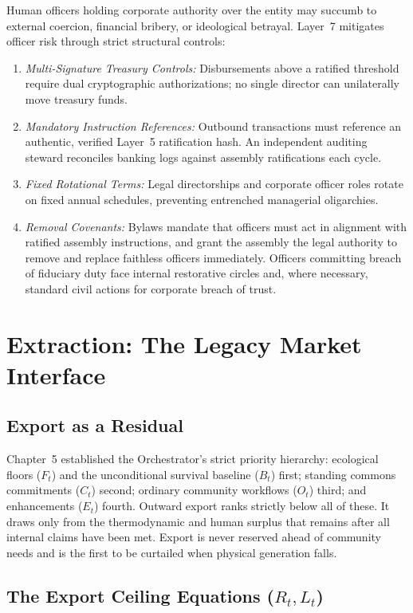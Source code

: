 Human officers holding corporate authority over the entity may succumb to external coercion, financial bribery, or ideological betrayal. Layer~7 mitigates officer risk through strict structural controls:
\begin{enumerate}
  \item \textit{Multi-Signature Treasury Controls:} Disbursements above a ratified threshold require dual cryptographic authorizations; no single director can unilaterally move treasury funds.
  \item \textit{Mandatory Instruction References:} Outbound transactions must reference an authentic, verified Layer~5 ratification hash. An independent auditing steward reconciles banking logs against assembly ratifications each cycle.
  \item \textit{Fixed Rotational Terms:} Legal directorships and corporate officer roles rotate on fixed annual schedules, preventing entrenched managerial oligarchies.
  \item \textit{Removal Covenants:} Bylaws mandate that officers must act in alignment with ratified assembly instructions, and grant the assembly the legal authority to remove and replace faithless officers immediately. Officers committing breach of fiduciary duty face internal restorative circles and, where necessary, standard civil actions for corporate breach of trust.
\end{enumerate}

\section{Extraction: The Legacy Market Interface}

\subsection{Export as a Residual}

Chapter~5 established the Orchestrator's strict priority hierarchy: ecological floors ($F_t$) and the unconditional survival baseline ($B_t$) first; standing commons commitments ($C_t$) second; ordinary community workflows ($O_t$) third; and enhancements ($E_t$) fourth. Outward export ranks strictly below all of these. It draws only from the thermodynamic and human surplus that remains after all internal claims have been met. Export is never reserved ahead of community needs and is the first to be curtailed when physical generation falls.

\subsection{\texorpdfstring{The Export Ceiling Equations ($R_t, L_t$)}{The Export Ceiling Equations (Rt, Lt)}}

